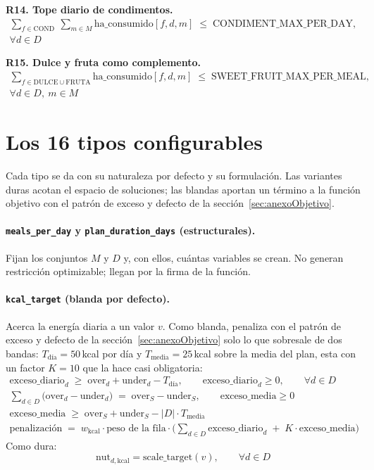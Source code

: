 \textbf{R14. Tope diario de condimentos.}
\begin{gather*}
\sum_{f \in \text{COND}}\ \sum_{m \in M} \text{ha\_consumido}[f,d,m] \;\le\; \text{CONDIMENT\_MAX\_PER\_DAY}, \\
\forall d \in D
\end{gather*}

\textbf{R15. Dulce y fruta como complemento.}
\begin{gather*}
\sum_{f \in \text{DULCE} \cup \text{FRUTA}} \text{ha\_consumido}[f,d,m] \;\le\; \text{SWEET\_FRUIT\_MAX\_PER\_MEAL}, \\
\forall d \in D,\ m \in M
\end{gather*}

\section{Los 16 tipos configurables}
\label{sec:anexoTipos}

Cada tipo se da con su naturaleza por defecto y su formulación. Las variantes duras acotan el espacio de soluciones; las blandas aportan un término a la función objetivo con el patrón de exceso y defecto de la sección~\ref{sec:anexoObjetivo}.

\paragraph{\texttt{meals\_per\_day} y \texttt{plan\_duration\_days} (estructurales).} Fijan los conjuntos $M$ y $D$ y, con ellos, cuántas variables se crean. No generan restricción optimizable; llegan por la firma de la función.

\paragraph{\texttt{kcal\_target} (blanda por defecto).} Acerca la energía diaria a un valor $v$. Como blanda, penaliza con el patrón de exceso y defecto de la sección~\ref{sec:anexoObjetivo} solo lo que sobresale de dos bandas: $T_{\text{día}} = 50$\,kcal por día y $T_{\text{media}} = 25$\,kcal sobre la media del plan, esta con un factor $K = 10$ que la hace casi obligatoria:
\begin{gather*}
\text{exceso\_diario}_d \;\ge\; \text{over}_d + \text{under}_d - T_{\text{día}}, \qquad \text{exceso\_diario}_d \ge 0, \qquad \forall d \in D \\
\sum_{d \in D} \big(\text{over}_d - \text{under}_d\big) \;=\; \text{over}_S - \text{under}_S, \qquad \text{exceso\_media} \ge 0 \\
\text{exceso\_media} \;\ge\; \text{over}_S + \text{under}_S - |D| \cdot T_{\text{media}} \\
\text{penalización} \;=\; w_{\text{kcal}} \cdot \text{peso de la fila} \cdot \Big( \sum_{d \in D} \text{exceso\_diario}_d \;+\; K \cdot \text{exceso\_media} \Big)
\end{gather*}
Como dura:
\begin{equation*}
\text{nut}_{d,\text{kcal}} = \text{scale\_target}(v), \qquad \forall d \in D
\end{equation*}

